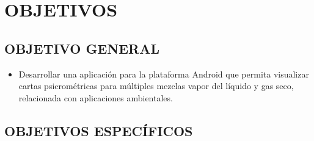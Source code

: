 \section{OBJETIVOS}
\label{cap1:sec:objetivos}

\subsection{OBJETIVO GENERAL}
\begin{itemize}
    \item Desarrollar una aplicación para la plataforma Android que permita visualizar cartas psicrométricas para múltiples mezclas vapor del líquido y gas seco, relacionada con aplicaciones ambientales. %
\end{itemize}
\subsection{OBJETIVOS ESPECÍFICOS}
